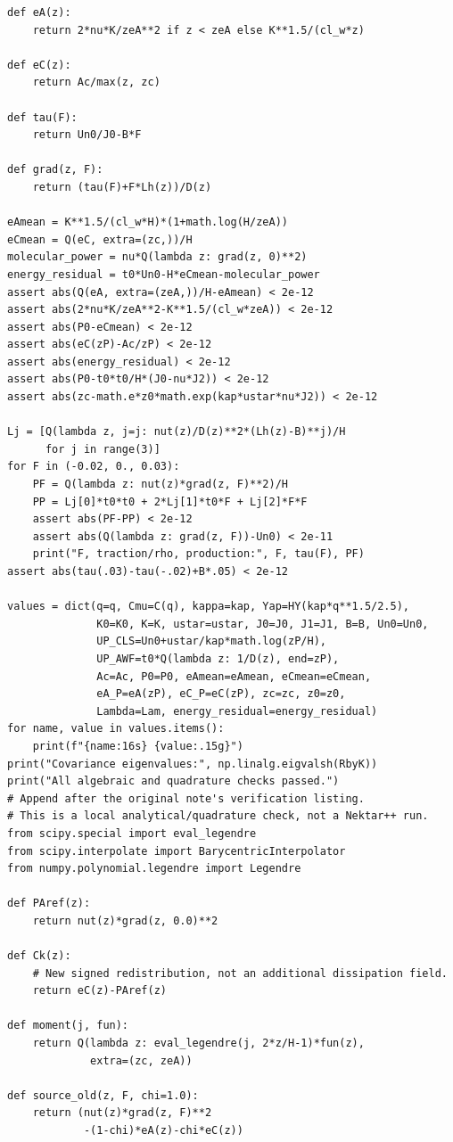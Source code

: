 \documentclass[11pt,a4paper]{article}
\numberwithin{equation}{section}
\begin{document}
\begin{lstlisting}[style=py]
def eA(z):
    return 2*nu*K/zeA**2 if z < zeA else K**1.5/(cl_w*z)

def eC(z):
    return Ac/max(z, zc)

def tau(F):
    return Un0/J0-B*F

def grad(z, F):
    return (tau(F)+F*Lh(z))/D(z)

eAmean = K**1.5/(cl_w*H)*(1+math.log(H/zeA))
eCmean = Q(eC, extra=(zc,))/H
molecular_power = nu*Q(lambda z: grad(z, 0)**2)
energy_residual = t0*Un0-H*eCmean-molecular_power
assert abs(Q(eA, extra=(zeA,))/H-eAmean) < 2e-12
assert abs(2*nu*K/zeA**2-K**1.5/(cl_w*zeA)) < 2e-12
assert abs(P0-eCmean) < 2e-12
assert abs(eC(zP)-Ac/zP) < 2e-12
assert abs(energy_residual) < 2e-12
assert abs(P0-t0*t0/H*(J0-nu*J2)) < 2e-12
assert abs(zc-math.e*z0*math.exp(kap*ustar*nu*J2)) < 2e-12

Lj = [Q(lambda z, j=j: nut(z)/D(z)**2*(Lh(z)-B)**j)/H
      for j in range(3)]
for F in (-0.02, 0., 0.03):
    PF = Q(lambda z: nut(z)*grad(z, F)**2)/H
    PP = Lj[0]*t0*t0 + 2*Lj[1]*t0*F + Lj[2]*F*F
    assert abs(PF-PP) < 2e-12
    assert abs(Q(lambda z: grad(z, F))-Un0) < 2e-11
    print("F, traction/rho, production:", F, tau(F), PF)
assert abs(tau(.03)-tau(-.02)+B*.05) < 2e-12

values = dict(q=q, Cmu=C(q), kappa=kap, Yap=HY(kap*q**1.5/2.5),
              K0=K0, K=K, ustar=ustar, J0=J0, J1=J1, B=B, Un0=Un0,
              UP_CLS=Un0+ustar/kap*math.log(zP/H),
              UP_AWF=t0*Q(lambda z: 1/D(z), end=zP),
              Ac=Ac, P0=P0, eAmean=eAmean, eCmean=eCmean,
              eA_P=eA(zP), eC_P=eC(zP), zc=zc, z0=z0,
              Lambda=Lam, energy_residual=energy_residual)
for name, value in values.items():
    print(f"{name:16s} {value:.15g}")
print("Covariance eigenvalues:", np.linalg.eigvalsh(RbyK))
print("All algebraic and quadrature checks passed.")
# Append after the original note's verification listing.
# This is a local analytical/quadrature check, not a Nektar++ run.
from scipy.special import eval_legendre
from scipy.interpolate import BarycentricInterpolator
from numpy.polynomial.legendre import Legendre

def PAref(z):
    return nut(z)*grad(z, 0.0)**2

def Ck(z):
    # New signed redistribution, not an additional dissipation field.
    return eC(z)-PAref(z)

def moment(j, fun):
    return Q(lambda z: eval_legendre(j, 2*z/H-1)*fun(z),
             extra=(zc, zeA))

def source_old(z, F, chi=1.0):
    return (nut(z)*grad(z, F)**2
            -(1-chi)*eA(z)-chi*eC(z))


\end{lstlisting}
\end{document}
